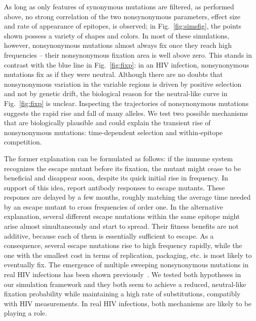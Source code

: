 \documentclass[rmp, twocolumn]{revtex4}
\newcommand{\FIG}[1]{Fig.~\ref{fig:#1}}
\begin{document}
As long as only features of synonymous mutations are filtered, as performed
above, no strong correlation of the two nonsynonymous parameters, effect size
and rate of appearance of epitopes, is observed; in \FIG{simsfig}, the points
shown possess a variety of shapes and colors. In most of these simulations, 
however, nonsynonymous mutations almost always fix once they reach high frequencies
-- their nonsynonymous fixation area is well above zero. This stands in contrast
with the blue line in \FIG{fixp}: in an HIV infection, nonsynonymous mutations fix as if they
were neutral. Although there are no doubts that nonsynonymous variation in the
variable regions is driven by positive selection and not by genetic drift, the
biological reason for the neutral-like curve in \FIG{fixp} is unclear.
Inspecting the trajectories of nonsynonymous mutations
suggests the rapid rise and fall of many alleles. We test two possible
mechanisms that are biologically plausible and could explain the transient rise
of nonsynonymous mutations: time-dependent selection and within-epitope
competition.

The former explanation can be formulated as follows: if the immune system
recognizes the escape mutant before its fixation, the mutant might cease to be
beneficial and disappear soon, despite its quick initial rise in frequency. In support of this idea,
\citet{richman_rapid_2003, bunnik_autologous_2008} report antibody responses to
escape mutants. These respones are delayed by a few months, roughly matching the
average time needed by an escape mutant to cross frequencies of order one.
In the alternative explanation, several different escape
mutations within the same epitope might arise almost simultaneously and start to
spread. Their fitness benefits are not additive, because each of them is
essentially sufficient to escape. As a consequence, several escape mutations rise to
high frequency rapidly, while the one with the smallest cost in terms of replication,
packaging, etc. is most likely to eventually fix. The emergence of
multiple sweeping nonsynonymous mutations in real HIV infections has been shown
previously~\citep{moore_limited_2009, bar_early_2012}.
We tested both hypotheses in our simulation framework and they both seem to
achieve a reduced, neutral-like fixation probability while maintaining a high
rate of substitutions, compatibly with HIV measurements. In real HIV infections,
both mechanisms are likely to be playing a role.
\end{document}
